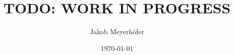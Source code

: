 \makeatletter %


\title{TODO: WORK IN PROGRESS}




\author{Jakob Meyerhöfer}
\newcommand{\authorShort}{J. Meyerhöfer}
\newcommand{\firstName}{Jakob}
\newcommand{\middleName}{Elias}
\newcommand{\lastName}{Meyerhöfer}
\newcommand{\initials}{JM}
\newcommand{\mail}{meyerhoe@rptu.de}
\newcommand{\city}{Rodalben}




\newcommand{\thesisLANGUAGE}{ENGLISH}
\newcommand{\thesisLanguage}{English}
\newcommand{\thesislanguage}{english}
\newcommand{\thesisLANG}{ENG}
\newcommand{\thesisLang}{Eng}
\newcommand{\thesislang}{eng}
\date{\today} %




\newcommand{\examinerA}{Prof. Dr. Ralf Hinze}
\newcommand{\examinerB}{Cass Alexandru (Gregor Cassian Alexandru), M.Sc.}
\newcommand{\thesisType}{Bachelor}




